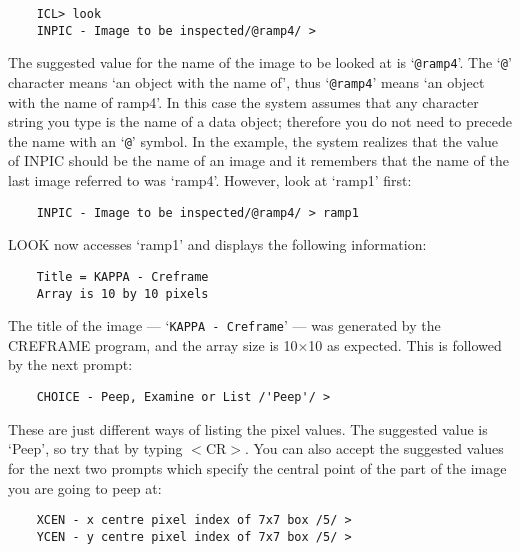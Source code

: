 \begin{small}
\begin{verbatim}
    ICL> look
    INPIC - Image to be inspected/@ramp4/ >
\end{verbatim}
\end{small}

The suggested value for the name of the image to be looked at is
`\verb+@ramp4+'.
The `\verb+@+' character means `an object with the name of', thus
`\verb+@ramp4+' means `an object with the name of ramp4'.
In this case the system assumes that any character string you type is the name
of a data object; therefore you do not need to precede the name with an
`\verb+@+' symbol.
In the example, the system realizes that the value of INPIC should be the name
of an image and it remembers that the name of the last image referred to was
`ramp4'.
However, look at `ramp1' first:

\begin{small}
\begin{verbatim}
    INPIC - Image to be inspected/@ramp4/ > ramp1
\end{verbatim}
\end{small}

LOOK now accesses `ramp1' and displays the following information:

\begin{small}
\begin{verbatim}
    Title = KAPPA - Creframe
    Array is 10 by 10 pixels
\end{verbatim}
\end{small}

The title of the image --- `\verb+KAPPA - Creframe+' --- was generated by the
CREFRAME program, and the array size is 10$\times$10 as expected.
This is followed by the next prompt:

\begin{small}
\begin{verbatim}
    CHOICE - Peep, Examine or List /'Peep'/ >
\end{verbatim}
\end{small}

These are just different ways of listing the pixel values.
The suggested value is `Peep', so try that by typing $<$CR$>$.
You can also accept the suggested values for the next two prompts which specify
the central point of the part of the image you are going to peep at:

\begin{small}
\begin{verbatim}
    XCEN - x centre pixel index of 7x7 box /5/ >
    YCEN - y centre pixel index of 7x7 box /5/ >
\end{verbatim}
\end{small}

